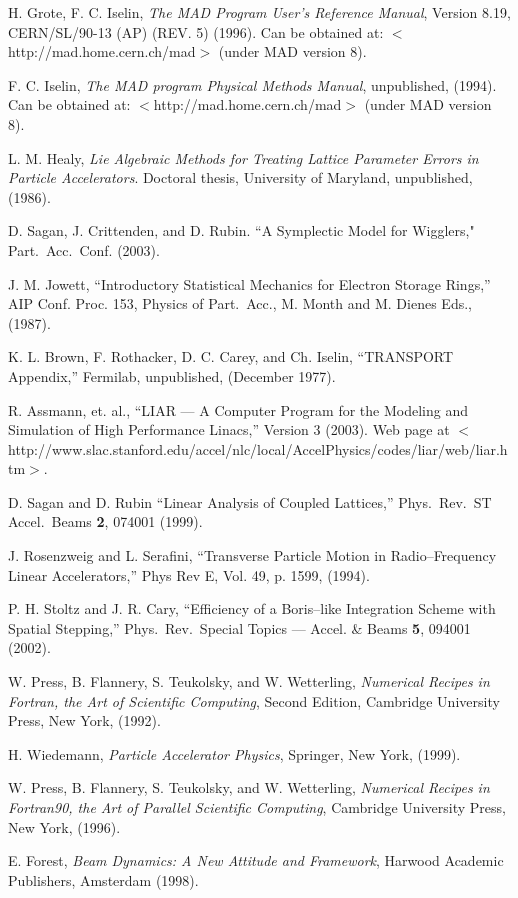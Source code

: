 \begin{thebibliography}{99}

H. Grote, F. C. Iselin, {\it The MAD Program User's Reference Manual},
Version 8.19, CERN/SL/90-13 (AP) (REV. 5) (1996). Can be obtained at:
$<$http://mad.home.cern.ch/mad$>$ (under MAD version 8).

F. C. Iselin, {\it The MAD program Physical Methods Manual}, 
unpublished, (1994).  Can be obtained at: $<$http://mad.home.cern.ch/mad$>$
(under MAD version 8).

L. M. Healy, {\it Lie Algebraic Methods for Treating Lattice Parameter
Errors in Particle Accelerators}. Doctoral thesis, University of
Maryland, unpublished, (1986).

D. Sagan, J. Crittenden, and D. Rubin.
``A Symplectic Model for Wigglers," Part.\ Acc.\ Conf. (2003).

J. M. Jowett, ``Introductory Statistical Mechanics
for Electron Storage Rings,'' AIP Conf. Proc. 153, Physics of Part.\ Acc.,
M. Month and M. Dienes Eds., (1987).

K. L. Brown, F. Rothacker, D. C. Carey, and Ch. Iselin, ``TRANSPORT
Appendix,'' Fermilab, unpublished, (December 1977).

R. Assmann, et. al., ``LIAR --- A Computer Program for the Modeling
and Simulation of High Performance Linacs,'' Version 3 (2003). Web page
at $<$http://www.slac.stanford.edu/accel/nlc/local/AccelPhysics/codes/liar/web/liar.htm$>$.

D. Sagan and D. Rubin ``Linear Analysis of Coupled Lattices,''
Phys.\ Rev.\ ST Accel.\ Beams {\bf 2}, 074001 (1999).

J. Rosenzweig and L. Serafini, ``Transverse Particle Motion in
Radio--Frequency Linear Accelerators,'' Phys Rev E, Vol. 49, p. 1599,
(1994).

P. H. Stoltz and J. R. Cary, ``Efficiency of a Boris--like Integration
Scheme with Spatial Stepping,'' Phys.\ Rev.\ Special Topics ---
Accel. \& Beams {\bf 5}, 094001 (2002).

W. Press, B. Flannery, S. Teukolsky, and W. Wetterling, {\em Numerical
Recipes in Fortran, the Art of Scientific Computing}, Second Edition,
Cambridge University Press, New York, (1992).

H. Wiedemann, {\em Particle Accelerator Physics}, Springer, New York, (1999). 

W. Press, B. Flannery, S. Teukolsky, and W. Wetterling, {\em Numerical
Recipes in Fortran90, the Art of Parallel Scientific Computing}, 
Cambridge University Press, New York, (1996).



E. Forest, {\em Beam Dynamics: A New Attitude and Framework},
Harwood Academic Publishers, Amsterdam (1998).


\end{thebibliography}
